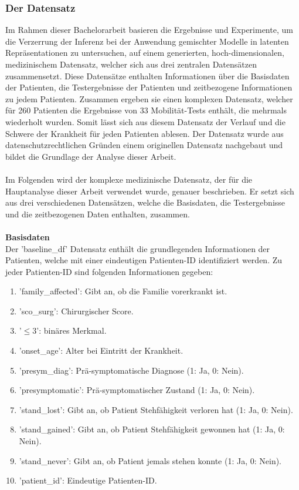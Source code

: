 \documentclass[%
thesis=student,%
coverpage=false,%
titlepage=false,%
headmarks=true, %
german,%
font=libertine, %
math=newpxtx, %
BCOR=5mm,%
coverBCOR=11mm%
]{tumbook}
\theoremstyle{break}
\begin{document}
\subsubsection{Der Datensatz}
Im Rahmen dieser Bachelorarbeit basieren die Ergebnisse und Experimente, um die Verzerrung der Inferenz bei der Anwendung gemischter Modelle in latenten Repräsentationen zu untersuchen, auf einem generierten, hoch-dimensionalen, medizinischem Datensatz, welcher sich aus drei zentralen Datensätzen zusammensetzt. Diese Datensätze enthalten Informationen über die Basisdaten der Patienten, die Testergebnisse der Patienten und zeitbezogene Informationen zu jedem Patienten. Zusammen ergeben sie einen komplexen Datensatz, welcher für 260 Patienten die Ergebnisse von 33 Mobilität-Tests enthält, die mehrmals wiederholt wurden. Somit lässt sich aus diesem Datensatz der Verlauf und die Schwere der Krankheit für jeden Patienten ablesen.  Der Datensatz wurde aus datenschutzrechtlichen Gründen einem originellen Datensatz nachgebaut und bildet die Grundlage der Analyse dieser Arbeit.\\
\\
Im Folgenden wird der komplexe medizinische Datensatz, der für die Hauptanalyse dieser Arbeit verwendet wurde, genauer beschrieben. Er setzt sich aus drei verschiedenen Datensätzen, welche die Basisdaten, die Testergebnisse und die zeitbezogenen Daten enthalten, zusammen. \\
\\
\textbf{Basisdaten}\\
Der 'baseline\_df' Datensatz enthält die grundlegenden Informationen der Patienten, welche mit einer eindeutigen Patienten-ID identifiziert werden. Zu jeder Patienten-ID sind folgenden Informationen gegeben: 
\begin{enumerate}
	\item 'family\_affected': Gibt an, ob die Familie vorerkrankt ist.
	\item 'sco\_surg': Chirurgischer Score.
	\item  '$\leq3$': binäres Merkmal.
	\item 'onset\_age': Alter bei Eintritt der Krankheit.
	\item 'presym\_diag': Prä-symptomatische Diagnose (1: Ja, 0: Nein).
	\item 'presymptomatic': Prä-symptomatischer Zustand (1: Ja, 0: Nein).
	\item 'stand\_lost': Gibt an, ob Patient Stehfähigkeit verloren hat (1: Ja, 0: Nein).
	\item 'stand\_gained': Gibt an, ob Patient Stehfähigkeit gewonnen hat (1: Ja, 0: Nein).
	\item 'stand\_never': Gibt an, ob Patient jemals stehen konnte (1: Ja, 0: Nein).
	\item 'patient\_id': Eindeutige Patienten-ID.
\end{enumerate}
\end{document}
